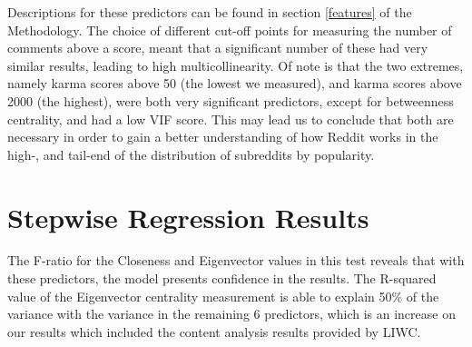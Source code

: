 \documentclass[bsc,frontabs,twoside,singlespacing,parskip,deptreport]{infthesis}
\begin{document}
Descriptions for these predictors can be found in section \ref{features} of the Methodology. The choice of different cut-off points for measuring the number of comments above a score, meant that a significant number of these had very similar results, leading to high multicollinearity. Of note is that the two extremes, namely karma scores above 50 (the lowest we measured), and karma scores above 2000 (the highest), were both very significant predictors, except for betweenness centrality, and had a low VIF score. This may lead us to conclude that both are necessary in order to gain a better understanding of how Reddit works in the high-, and tail-end of the distribution of subreddits by popularity.

\newpage

\section{Stepwise Regression Results}

The F-ratio for the Closeness and Eigenvector values in this test reveals that with these predictors, the model presents confidence in the results. The R-squared value of the Eigenvector centrality measurement is able to explain 50\% of the variance with the variance in the remaining 6 predictors, which is an increase on our results which included the content analysis results provided by LIWC.

\begin{table}[!h]
\centering
{}
\caption{Summary of stepwise regression results for RQ2}
\label{tab:stepwise-rq2}
\end{table}
\end{document}
